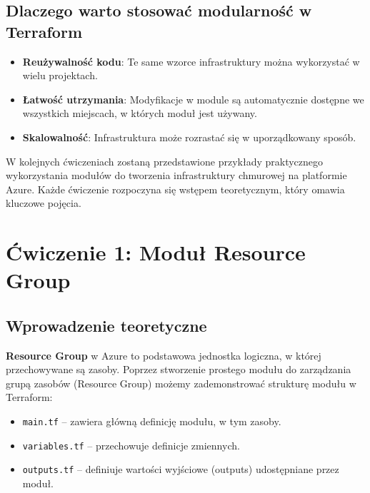 \documentclass{article}
\begin{document}
\subsection{Dlaczego warto stosować modularność w Terraform}
\begin{itemize}
    \item \textbf{Reużywalność kodu}: Te same wzorce infrastruktury można wykorzystać w wielu projektach.
    \item \textbf{Łatwość utrzymania}: Modyfikacje w module są automatycznie dostępne we wszystkich miejscach, w których moduł jest używany.
    \item \textbf{Skalowalność}: Infrastruktura może rozrastać się w uporządkowany sposób.
\end{itemize}

\vspace{5mm}

W kolejnych ćwiczeniach zostaną przedstawione przykłady praktycznego wykorzystania modułów do tworzenia infrastruktury chmurowej na platformie Azure. Każde ćwiczenie rozpoczyna się wstępem teoretycznym, który omawia kluczowe pojęcia.

\section{Ćwiczenie 1: Moduł Resource Group}

\subsection{Wprowadzenie teoretyczne}
\textbf{Resource Group} w Azure to podstawowa jednostka logiczna, w której przechowywane są zasoby. Poprzez stworzenie prostego modułu do zarządzania grupą zasobów (Resource Group) możemy zademonstrować strukturę modułu w Terraform:
\begin{itemize}
    \item \texttt{main.tf} – zawiera główną definicję modułu, w tym zasoby.
    \item \texttt{variables.tf} – przechowuje definicje zmiennych.
    \item \texttt{outputs.tf} – definiuje wartości wyjściowe (outputs) udostępniane przez moduł.
\end{itemize}
\end{document}
